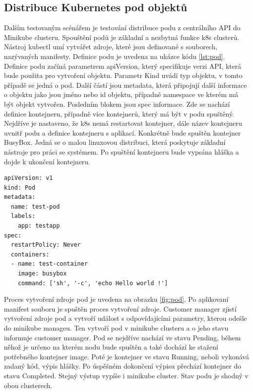 \subsection{Distribuce Kubernetes pod objektů}
    Dalším testovaným scénářem je testování distribuce podu z centrálního API do \linebreak Minikube clusteru. Spouštění podů je základní a nezbytná funkce k8s clusterů. Nástroj kubectl umí vytvářet zdroje, které jsou definované s souborech, nazývaných manifesty. Definice podu je uvedena na ukázce kódu \ref{lst:pod}. Definice podu začíná parametrem apiVersion, který specifikuje verzi API, která bude použita pro vytvoření objektu. Parametr Kind uvádí typ objektu, v tomto případě se jedná o pod. Další částí jsou metadata, která připojují další informace o objektu jako jsou jméno nebo id objektu, případně namespace ve kterém má být objekt vytvořen. Posledním blokem jsou spec informace. Zde se nachází definice kontejneru, případně více kontejnerů, který má být v podu spuštěný. Nejdříve je nastaveno, že k8s nemá restartovat kontejner, dále název kontejneru uvnitř podu a definice kontejneru s aplikací. Konkrétně bude spuštěn kontejner BusyBox. Jedná se o malou linuxovou distribuci, která poskytuje základní nástroje pro práci se systémem. Po spuštění kontejneru bude vypsána hláška a dojde k ukončení kontejneru.
\begin{lstlisting}[caption={pod.yml, definice podu},label=lst:pod]
apiVersion: v1
kind: Pod
metadata:
  name: test-pod
  labels:
    app: testapp
spec:
  restartPolicy: Never
  containers:
  - name: test-container
    image: busybox
    command: ['sh', '-c', 'echo Hello world !']
\end{lstlisting}
			  Proces vytvoření zdroje pod je uvedena na obrazku \ref{fig:pod}. Po aplikovaní manifest souboru je spuštěn proces vytvoření zdroje. Customer manager zjistí vytvoření zdroje pod a vytvoří událost s odpovídajícími parametry, kterou odešle do minikube manageu. Ten vytvoří pod v minikube clusteru a o jeho stavu informuje customer manager. Pod se nejdříve nachází ve stavu Pending, během něhož je určeno na kterém nodu bude spuštěn a také dochází ke stažení potřebného kontejner image. Poté je kontejner ve stavu Running, neboli vykonává zadaný kód, výpis hlášky. Po úspěšném dokončení výpisu přechází kontejner do stavu Completed. Stejný výstup vypíše i minikube cluster. Stav podu je shodný v obou clusterech.
